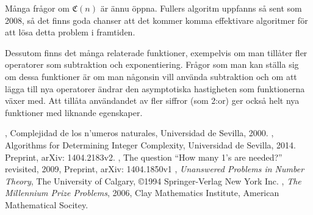 \documentclass[a4paper,titlepage]{article}
\newcommand{\C}[1]{\mathfrak C \left( #1 \right)}
\theoremstyle{definition}
\begin{document}
        Många frågor om $\C{n}$ är ännu öppna. Fullers algoritm uppfanns
        så sent som 2008, så det finns goda chanser att det kommer komma
        effektivare algoritmer för att lösa detta problem i framtiden. 
        
        Dessutom finns det många relaterade funktioner, exempelvis om man tillåter
        fler operatorer som subtraktion och exponentiering. Frågor som man kan
        ställa sig om dessa funktioner är om man någonsin vill använda
        subtraktion och om att lägga till nya operatorer ändrar den
        asymptotiska hastigheten som funktionerna växer med.
        Att tillåta användandet av fler siffror (som 2:or) ger också helt nya
        funktioner med liknande egenskaper. 

\newpage
\begin{thebibliography}{9}

        , Complejidad de los n'umeros naturales,
        Universidad de Sevilla, 2000. 
     	, Algorithms for Determining
        Integer Complexity, Universidad de Sevilla, 2014. Preprint, arXiv: 1404.2183v2.
     	, The question ``How many 1’s
        are needed?'' revisited, 2009, Preprint, arXiv: 1404.1850v1
     	, \emph{Unanswered Problems in Number Theory}, The University of Calgary, 
        \copyright 1994 Springer-Verlag New York Inc. 
     	, \emph{The Millennium Prize Problems}, 2006, Clay Mathematics Institute, American Mathematical Socitey.

\end{thebibliography}
%
\end{document}
